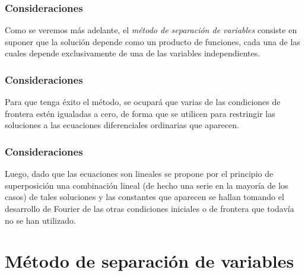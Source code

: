 \begin{frame}
\frametitle{Consideraciones}
Como se veremos más adelante, el \emph{método de separación de variables} consiste en suponer que la solución depende como un producto de funciones, cada una de las cuales depende exclusivamente de una de las variables independientes.
\end{frame}
\begin{frame}
\frametitle{Consideraciones}
Para que tenga éxito el método, se ocupará que varias de las condiciones de frontera estén igualadas a cero, de forma que se utilicen para restringir las soluciones a las ecuaciones diferenciales ordinarias que aparecen.
\end{frame}
\begin{frame}
\frametitle{Consideraciones}
Luego, dado que las ecuaciones son lineales se propone por el principio de superposición una combinación lineal (de hecho una serie en la mayoría de los casos) de tales soluciones y las constantes que aparecen se hallan tomando el desarrollo de Fourier de las otras condiciones iniciales o de frontera que todavía no se han utilizado.
\end{frame}
\section{Método de separación de variables}

